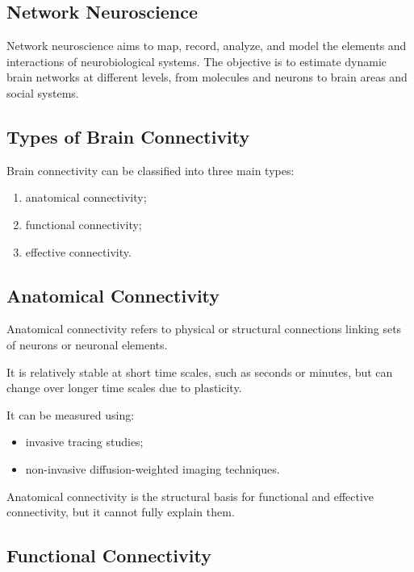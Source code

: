 \subsection{Network Neuroscience}

Network neuroscience aims to map, record, analyze, and model the elements and interactions of neurobiological systems. The objective is to estimate dynamic brain networks at different levels, from molecules and neurons to brain areas and social systems.

\subsection{Types of Brain Connectivity}

Brain connectivity can be classified into three main types:

\begin{enumerate}[noitemsep]
    \item anatomical connectivity;
    \item functional connectivity;
    \item effective connectivity.
\end{enumerate}

\subsection{Anatomical Connectivity}

Anatomical connectivity refers to physical or structural connections linking sets of neurons or neuronal elements.

It is relatively stable at short time scales, such as seconds or minutes, but can change over longer time scales due to plasticity.

It can be measured using:

\begin{itemize}[noitemsep]
    \item invasive tracing studies;
    \item non-invasive diffusion-weighted imaging techniques.
\end{itemize}

Anatomical connectivity is the structural basis for functional and effective connectivity, but it cannot fully explain them.

\subsection{Functional Connectivity}

